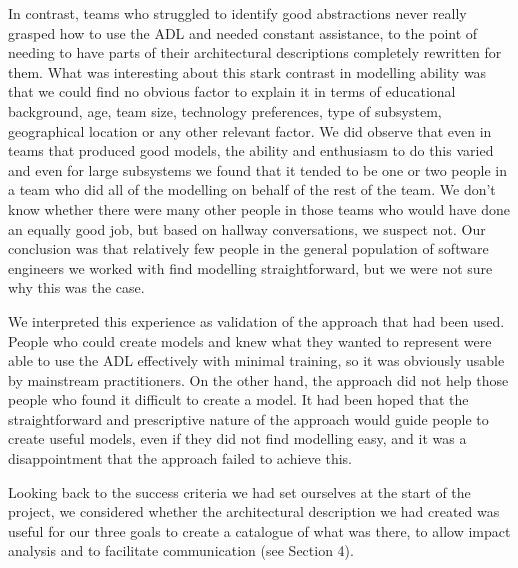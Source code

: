   In contrast, teams who struggled to identify good abstractions never really grasped how to use the ADL and needed constant assistance, to the point of needing to have parts of their architectural descriptions completely rewritten for them.   What was interesting about this stark contrast in modelling ability was that we could find no obvious factor to explain it in terms of educational background, age, team size, technology preferences, type of subsystem, geographical location or any other relevant factor.  We did observe that even in teams that produced good models, the ability and enthusiasm to do this varied and even for large subsystems we found that it tended to be one or two people in a team who did all of the modelling on behalf of the rest of the team.  We don't know whether there were many other people in those teams who would have done an equally good job, but based on hallway conversations, we suspect not.  Our conclusion was that relatively few people in the general population of software engineers we worked with find modelling straightforward, but we were not sure why this was the case.

  We interpreted this experience as validation of the approach that had been used.  People who could create models and knew what they wanted to represent were able to use the ADL effectively with minimal training, so it was obviously usable by mainstream practitioners.  On the other hand, the approach did not help those people who found it difficult to create a model.  It had been hoped that the straightforward and prescriptive nature of the approach would guide people to create useful models, even if they did not find modelling easy, and it was a disappointment that the approach failed to achieve this.

  Looking back to the success criteria we had set ourselves at the start of the project, we considered whether the architectural description we had created was useful for our three goals to create a catalogue of what was there, to allow impact analysis and to facilitate communication (see Section 4).
  
